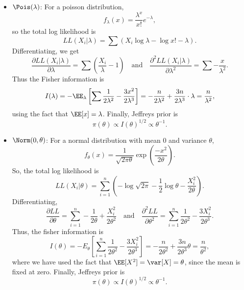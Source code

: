 \begin{itemize}
    \item $\Pois(\lambda)$: For a poisson distribution, 
    \[f_{\lambda}(x) = \frac{\lambda^x}{x!}e^{-\lambda},\]
    so the total log likelihood is
    \[LL(X_i|\lambda) = \sum (X_i\log \lambda - \log x!-\lambda).\]
    Differentiating, we get 
    \[\frac{\partial LL(X_i|\lambda)}{\partial \lambda} = \sum\left(\frac{X_i}{\lambda} - 1\right)\quad \text{and}\quad \frac{\partial^2 LL(X_i|\lambda)}{\partial \lambda^2} = \sum -\frac{x}{\lambda^2}.\]
    Thus the Fisher information is
    \[I(\lambda) = -\EE_{\lambda}\left[\sum \frac{1}{2\lambda^2} - \frac{3x^2}{2\lambda^3}\right] = -\frac{n}{2\lambda^2} + \frac{3n}{2\lambda^3}\cdot \lambda = \frac{n}{\lambda^2},\]
    using the fact that $\EE[x]=\lambda$. Finally, Jeffreys prior is
    \[\pi(\theta)\propto I(\theta)^{1/2}\propto \theta^{-1}.\]
    \item $\Norm(0,\theta)$: For a normal distribution with mean $0$ and variance $\theta$,
    \[f_\theta(x) = \frac{1}{\sqrt{2\pi \theta}}\exp\left(\frac{-x^2}{2\theta}\right).\]
    So, the total log likelihood is 
    \[LL(X_i|\theta) = \sum_{i=1}^n \left(-\log{\sqrt{2\pi}} - \frac{1}{2}\log \theta - \frac{X_i^2}{2\theta}\right).\]
    Differentiating,
    \[\frac{\partial LL}{\partial \theta} = \sum_{i=1}^n -\frac{1}{2\theta} + \frac{X_i^2}{2\theta^2} \quad \text{and}\quad \frac{\partial^2 LL}{\partial \theta^2} = \sum_{i=1}^n \frac{1}{2\theta^2} - \frac{3X_i^2}{2\theta^3}.\]
    Thus, the fisher information is
    \[I(\theta) = -E_{\theta}\left[\sum_{i=1}^n \frac{1}{2\theta^2} - \frac{3X_i^2}{2\theta^3}\right] = -\frac{n}{2\theta^2} + \frac{3n}{2\theta^3}\theta = \frac{n}{\theta^2},\]
    where we have used the fact that $\EE[X^2] = \var[X] = \theta$, since the mean is fixed at zero. Finally, Jeffreys prior is 
    \[\pi(\theta)\propto I(\theta)^{1/2}\propto \theta^{-1}.\]
\end{itemize}